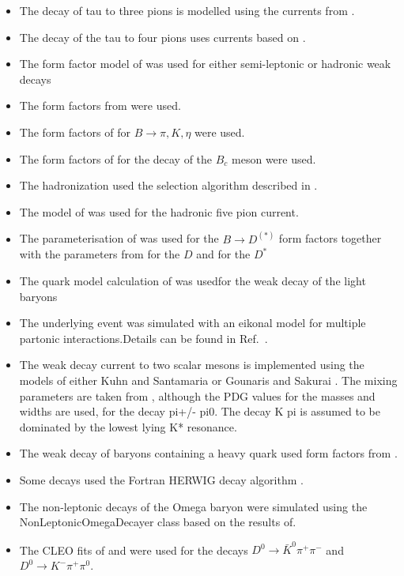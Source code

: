 \documentclass{article}
\begin{document}
\begin{itemize}
\item The decay of tau to three pions is modelled using the currents from \cite{Asner:1999kj}.
\item The decay of the tau to four pions uses currents based on \cite{Bondar:2002mw}.
\item The form factor model of \cite{Bauer:1986bm,Wirbel:1985ji} was used for either semi-leptonic or hadronic weak decays
\item The form factors from \cite{Ivanov:1996fj} were used.
\item The form factors of \cite{Ball:2004ye} for $B\to\pi, K, \eta$ were used.
\item The form factors of \cite{Kiselev:2002vz} for the decay of the $B_c$ meson were used.
\item The hadronization used the selection algorithm described in \cite{Kupco:1998fx}.
\item The model of \cite{Kuhn:2006nw} was used for the hadronic five pion current.
\item The parameterisation of \cite{Caprini:1997mu} was used for the $B\to D^{(*)}$ form factors together with the parameters from\cite{Snyder:2007qn} for the $D$ and \cite{Aubert:2007rs} for the $D^*$
\item The quark model calculation of \cite{Schlumpf:1994fb} was usedfor the weak decay of the light baryons
\item The underlying event was simulated with an eikonal model for multiple partonic interactions.Details can be found in Ref.~\cite{Bahr:2008dy,Bahr:2009ek}.
\item The weak decay current to two scalar mesons is implemented using the models of either Kuhn and Santamaria \cite{Kuhn:1990ad} or Gounaris and Sakurai \cite{Gounaris:1968mw}. The mixing parameters are taken from \cite{Asner:1999kj}, although the PDG values for the masses and widths are used, for the decay pi+/- pi0. The decay K pi is assumed to  be dominated by the lowest lying K* resonance.
\item The weak decay of baryons containing a heavy quark used form factors from \cite{Cheng:1995fe,Cheng:1996cs}.
\item Some decays used the Fortran HERWIG decay algorithm \cite{Corcella:2000bw}.
\item The  non-leptonic decays of the Omega baryon were simulated using the NonLeptonicOmegaDecayer class based on the results of\cite{Borasoy:1999ip}.
\item The CLEO fits of \cite{Muramatsu:2002jp} and \cite{Kopp:2000gv} were used for the decays $D^0\to\bar{K}^0\pi^+\pi^-$ and $D^0\to K^-\pi^+\pi^0$.

\end{itemize}
\end{document}
